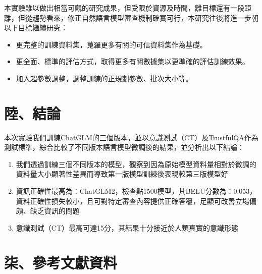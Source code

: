 \documentclass[12pt,a4paper,MingLiU,UTF8,natbib]{article}
\begin{document}
	本實驗雖以做出相當可觀的研究成果，但受限於資源及時間，離目標還有一段距離，但從趨勢看來，修正自然語言模型審查機制確實可行，本研究往後將進一步朝以下目標繼續研究：
	
	\begin{itemize}
		\item 更完整的訓練資料集，蒐羅更多有關的可信資料集作為基礎。
		\item 更全面、標準的評估方式，取得更多有關數據集以更準確的評估訓練效果。
		\item 加入超參數調整，調整訓練的正規劃參數、批次大小等。
	\end{itemize}

	\section{陸、結論}
	本次實驗我們訓練ChatGLM的三個版本，並以意識測試（CT）及TrustfulQA作為測試標準，綜合比較了不同版本語言模型微調後的結果，並分析出以下結論：
		\begin{enumerate}
			\item 我們透過訓練三個不同版本的模型，觀察到因為原始模型資料量相對於微調的資料量大小顯著性差異而導致第一版模型訓練後表現較第三版模型好
			\item 資訊正確性最高為：ChatGLM2，檢查點1500模型，其BELU分數為：0.053，資料正確性損失較小，且可對特定審查內容提供正確答覆，足顯可改善立場偏頗、缺乏資訊的問題
			\item 意識測試（CT）最高可達15分，其結果十分接近於人類真實的意識形態
		\end{enumerate}
	\section{柒、參考文獻資料}
	
	\renewcommand{\refname}{}
	
\end{document}
